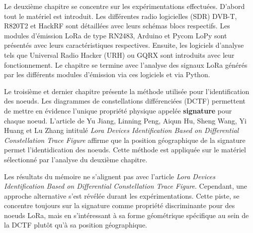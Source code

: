 \documentclass[a4paper,11pt]{article}
\begin{document}
\vspace{0.2cm}

\noindent Le deuxième chapitre se concentre sur les expérimentations effectuées. D'abord tout le matériel est introduit. Les différentes radio logicielles (SDR) DVB-T, R820T2 et HackRF sont détaillées avec leurs schémas blocs respectifs. Les modules d'émission LoRa de type RN2483, Arduino et Pycom LoPy sont présentés avec leurs caractéristiques respectives. Ensuite, les logiciels d'analyse tels que Universal Radio Hacker (URH) ou GQRX sont introduits avec leur fonctionnement. Le chapitre se termine avec l'analyse des signaux LoRa générés par les différents modules d'émission via ces logiciels et via Python.

\vspace{0.2cm}

\noindent Le troisième et dernier chapitre présente la méthode utilisée pour l'identification des noeuds. Les diagrammes de constellations différenciées (DCTF) permettent de mettre en évidence l'unique propriété physique appelée \textbf{signature} pour chaque noeud. L'article de Yu Jiang, Linning Peng, Aiqun Hu, Sheng Wang, Yi Huang et Lu Zhang intitulé \textit{Lora Devices Identification Based on Differential Constellation Trace Figure} affirme que la position géographique de la signature permet l'identidication des noeuds. Cette méthode est appliquée sur le matériel sélectionné par l'analyse du deuxième chapitre.

\vspace{0.2cm}

\noindent Les résultats du mémoire ne s'alignent pas avec l'article \textit{Lora Devices Identification Based on Differential Constellation Trace Figure}. Cependant, une approche alternative s'est révélée durant les expérimentations. Cette piste, se concentre toujours sur la signature comme propriété discriminante pour des noeuds LoRa, mais en s'intéressant à sa forme géométrique spécifique au sein de la DCTF plutôt qu'à sa position géographique.
\end{document}
